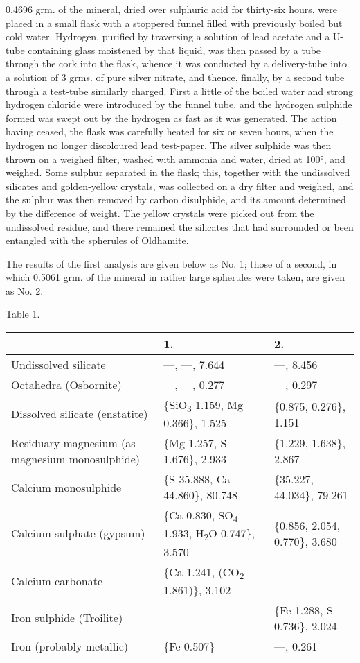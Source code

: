\documentclass[a4paper, 12pt, oneside]{article}
\begin{document}
0.4696 grm. of the mineral, dried over sulphuric acid for thirty-six hours, were placed in a small flask with a stoppered funnel filled with previously boiled but cold water. Hydrogen, purified by traversing a solution of lead acetate and a U-tube containing glass moistened by that liquid, was then passed by a tube through the cork into the flask, whence it was conducted by a delivery-tube into a solution of 3 grms. of pure silver nitrate, and thence, finally, by a second tube through a test-tube similarly charged. First a little of the boiled water and strong hydrogen chloride were introduced by the funnel tube, and the hydrogen sulphide formed was swept out by the hydrogen as fast as it was generated. The action having ceased, the flask was carefully heated for six or seven hours, when the hydrogen no longer discoloured lead test-paper. The silver sulphide was then thrown on a weighed filter, washed with ammonia and water, dried at 100°, and weighed. Some sulphur separated in the flask; this, together with the undissolved silicates and golden-yellow crystals, was collected on a dry filter and weighed, and the sulphur was then removed by carbon disulphide, and its amount determined by the difference of weight. The yellow crystals were picked out from the undissolved residue, and there remained the silicates that had surrounded or been entangled with the spherules of Oldhamite.

The results of the first analysis are given below as No. 1; those of a second, in which 0.5061 grm. of the mineral in rather large spherules were taken, are given as No. 2.
\begin{center}
Table 1.
\end{center}
\begin{table}[H]
    \centering
    \footnotesize
    \begin{tabular}{p{45mm} p{30mm} p{30mm}}
        ~ & 1. & 2. \\ \hline
        Undissolved silicate & ---, ---, 7.644 & ---, 8.456 \\ 
        Octahedra (Osbornite) & ---, ---, 0.277 & ---, 0.297 \\ 
        Dissolved silicate (enstatite) & \{SiO\textsubscript{3} 1.159, Mg 0.366\}, 1.525 & \{0.875, 0.276\}, 1.151 \\ 
        Residuary magnesium (as magnesium monosulphide) & \{Mg 1.257, S 1.676\}, 2.933 & \{1.229, 1.638\}, 2.867 \\ 
        Calcium monosulphide & \{S 35.888, Ca 44.860\}, 80.748 & \{35.227, 44.034\}, 79.261 \\ 
        Calcium sulphate (gypsum) & \{Ca 0.830, SO\textsubscript{4} 1.933, H\textsubscript{2}O 0.747\}, 3.570 & \{0.856, 2.054, 0.770\}, 3.680 \\
        Calcium carbonate & \{Ca 1.241, (CO\textsubscript{2} 1.861)\}, 3.102 & ~ \\ 
        Iron sulphide (Troilite) & ~ & \{Fe 1.288, S 0.736\}, 2.024\\ 
        Iron (probably metallic) & \{Fe 0.507\} & ---, 0.261\\ 
    \end{tabular}
\end{table}
\end{document}
